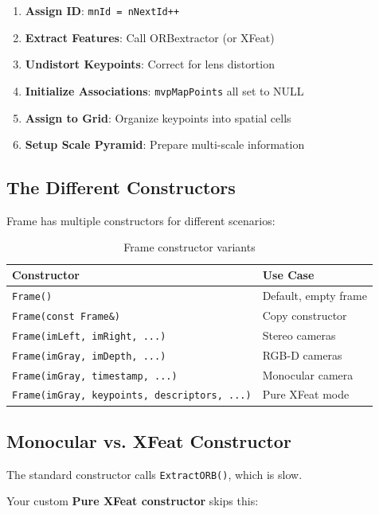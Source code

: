 \begin{enumerate}
    \item \textbf{Assign ID}: \texttt{mnId = nNextId++}
    \item \textbf{Extract Features}: Call ORBextractor (or XFeat)
    \item \textbf{Undistort Keypoints}: Correct for lens distortion
    \item \textbf{Initialize Associations}: \texttt{mvpMapPoints} all set to NULL
    \item \textbf{Assign to Grid}: Organize keypoints into spatial cells
    \item \textbf{Setup Scale Pyramid}: Prepare multi-scale information
\end{enumerate}

\subsection{The Different Constructors}

Frame has multiple constructors for different scenarios:

\begin{table}[H]
\centering
\begin{tabular}{@{}ll@{}}
\toprule
\textbf{Constructor} & \textbf{Use Case} \\
\midrule
\texttt{Frame()} & Default, empty frame \\
\texttt{Frame(const Frame\&)} & Copy constructor \\
\texttt{Frame(imLeft, imRight, ...)} & Stereo cameras \\
\texttt{Frame(imGray, imDepth, ...)} & RGB-D cameras \\
\texttt{Frame(imGray, timestamp, ...)} & Monocular camera \\
\texttt{Frame(imGray, keypoints, descriptors, ...)} & Pure XFeat mode \\
\bottomrule
\end{tabular}
\caption{Frame constructor variants}
\end{table}

\subsection{Monocular vs. XFeat Constructor}

The standard constructor calls \texttt{ExtractORB()}, which is slow.

Your custom \textbf{Pure XFeat constructor} skips this:


